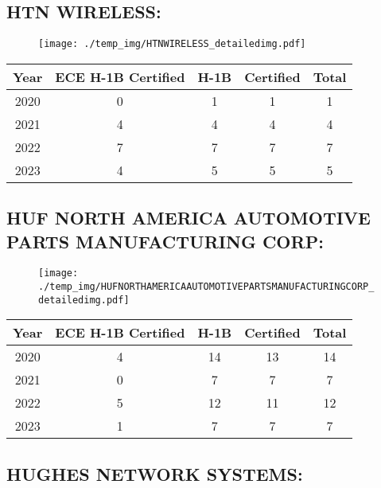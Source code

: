 \documentclass{article}%
\begin{document}
%
\newpage%
\subsection{HTN WIRELESS:}%
\label{subsec:HTNWIRELESS}%
\label{HTNWIRELESSdetailed}%


\begin{figure}[htbp]%
\centering%
\texttt{[image: ./temp\_img/HTNWIRELESS\_detailedimg.pdf]}%
\end{figure}

%
\begin{longtable}{c|c|c|c|c}%
\hline%
Year&ECE H{-}1B Certified&H{-}1B&Certified&Total\\%
\hline%
2020&0&1&1&1\\%
\hline%
2021&4&4&4&4\\%
\hline%
2022&7&7&7&7\\%
\hline%
2023&4&5&5&5\\%
\hline%
\end{longtable}

%
\newpage%
\subsection{HUF NORTH AMERICA AUTOMOTIVE PARTS MANUFACTURING CORP:}%
\label{subsec:HUFNORTHAMERICAAUTOMOTIVEPARTSMANUFACTURINGCORP}%
\label{HUFNORTHAMERICAAUTOMOTIVEPARTSMANUFACTURINGCORPdetailed}%


\begin{figure}[htbp]%
\centering%
\texttt{[image: ./temp\_img/HUFNORTHAMERICAAUTOMOTIVEPARTSMANUFACTURINGCORP\_detailedimg.pdf]}%
\end{figure}

%
\begin{longtable}{c|c|c|c|c}%
\hline%
Year&ECE H{-}1B Certified&H{-}1B&Certified&Total\\%
\hline%
2020&4&14&13&14\\%
\hline%
2021&0&7&7&7\\%
\hline%
2022&5&12&11&12\\%
\hline%
2023&1&7&7&7\\%
\hline%
\end{longtable}

%
\newpage%
\subsection{HUGHES NETWORK SYSTEMS:}%
\label{subsec:HUGHESNETWORKSYSTEMS}%
\label{HUGHESNETWORKSYSTEMSdetailed}%
\end{document}
